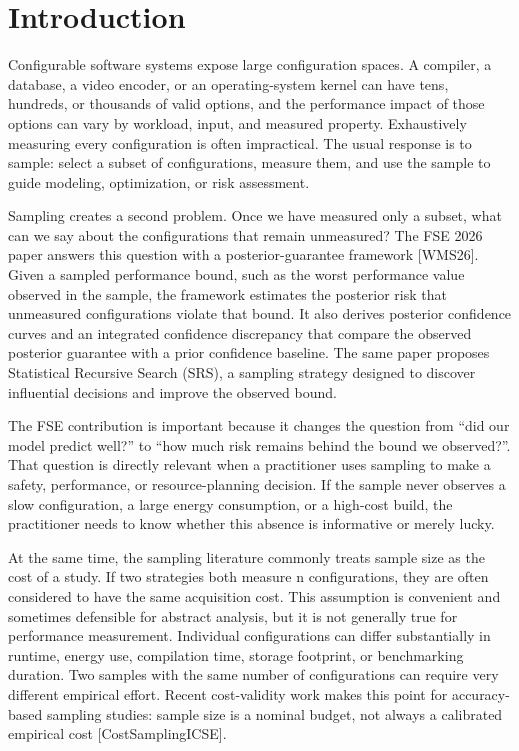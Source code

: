 \documentclass[smallcondensed]{svjour3}
\begin{document}
\section{Introduction}\label{introduction}

Configurable software systems expose large configuration spaces. A
compiler, a database, a video encoder, or an operating-system kernel can
have tens, hundreds, or thousands of valid options, and the performance
impact of those options can vary by workload, input, and measured
property. Exhaustively measuring every configuration is often
impractical. The usual response is to sample: select a subset of
configurations, measure them, and use the sample to guide modeling,
optimization, or risk assessment.

Sampling creates a second problem. Once we have measured only a subset,
what can we say about the configurations that remain unmeasured? The FSE
2026 paper answers this question with a posterior-guarantee framework
{[}WMS26{]}. Given a sampled performance bound, such as the worst
performance value observed in the sample, the framework estimates the
posterior risk that unmeasured configurations violate that bound. It
also derives posterior confidence curves and an integrated confidence
discrepancy that compare the observed posterior guarantee with a prior
confidence baseline. The same paper proposes Statistical Recursive
Search (SRS), a sampling strategy designed to discover influential
decisions and improve the observed bound.

The FSE contribution is important because it changes the question from
``did our model predict well?'' to ``how much risk remains behind the
bound we observed?''. That question is directly relevant when a
practitioner uses sampling to make a safety, performance, or
resource-planning decision. If the sample never observes a slow
configuration, a large energy consumption, or a high-cost build, the
practitioner needs to know whether this absence is informative or merely
lucky.

At the same time, the sampling literature commonly treats sample size as
the cost of a study. If two strategies both measure n configurations,
they are often considered to have the same acquisition cost. This
assumption is convenient and sometimes defensible for abstract analysis,
but it is not generally true for performance measurement. Individual
configurations can differ substantially in runtime, energy use,
compilation time, storage footprint, or benchmarking duration. Two
samples with the same number of configurations can require very
different empirical effort. Recent cost-validity work makes this point
for accuracy-based sampling studies: sample size is a nominal budget,
not always a calibrated empirical cost {[}CostSamplingICSE{]}.
\end{document}
